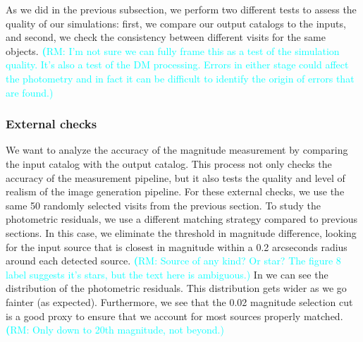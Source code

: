 \documentclass[twocolumn]{aastex62}
\newcommand{\rachel}[1]{{\textcolor{cyan}{{\textbf (RM: #1)}}}}
\begin{document}
As we did in the previous subsection, we perform two different tests to assess the quality of our simulations: first, we compare our output catalogs to the inputs, and second, we check the consistency between different visits for the same objects. \rachel{I'm not sure we can fully frame this as a test of the simulation quality.  It's also a test of the DM processing.  Errors in either stage could affect the photometry and in fact it can be difficult to identify the origin of errors that are found.}

\subsubsection{External checks}
\label{sec:external_photometry}

We want to analyze the accuracy of the magnitude measurement by comparing the input catalog with the output catalog. This process not only checks
the accuracy of the measurement pipeline, but it also tests the quality and level of realism of the image generation pipeline.
For these external checks, we use the same 50 randomly selected visits from the previous section.
To study the photometric residuals, we use a different matching strategy compared to previous sections. In this case, we eliminate the threshold
in magnitude difference, looking for the input source that is closest in magnitude within a 0.2 arcseconds radius around each detected
source. \rachel{Source of any kind?  Or star?  The figure 8 label suggests it's stars, but the text here is ambiguous.} In  we can see the distribution of the photometric residuals. This distribution gets wider as we go
fainter (as expected). Furthermore, we see that the 0.02 magnitude selection cut is a good proxy to ensure that we account for most sources properly matched. \rachel{Only down to 20th magnitude, not beyond.}
\end{document}
